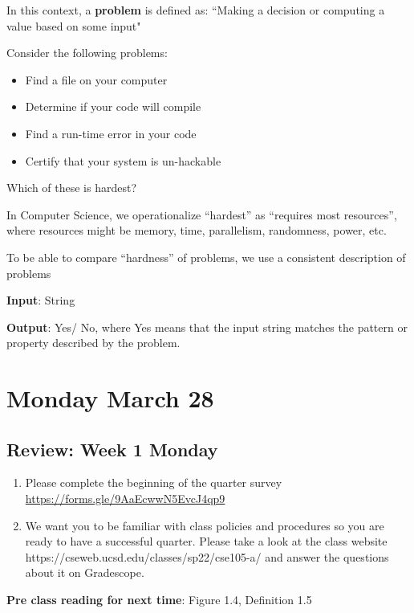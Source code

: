 In this context, a {\bf problem} is defined as: ``Making a decision or computing a value based on some input"

Consider the following problems: 
\begin{itemize}
   \item Find a file on your computer
   \item Determine if your code will compile
   \item Find a run-time error in your code
   \item Certify that your system is un-hackable
\end{itemize}

Which of these is hardest?

\vfill

In Computer Science, we operationalize ``hardest'' as ``requires most resources'', where
resources might be memory, time, parallelism, randomness, power, etc.

To be able to compare ``hardness'' of problems, we use a consistent description of problems

{\bf Input}: String

{\bf Output}: Yes/ No, where Yes means that the input string matches the pattern or property described by the problem.


\newpage
\section*{Monday March 28}


    
\newpage
\subsection*{Review: Week 1 Monday}
\begin{enumerate}
\item Please complete the beginning of the quarter survey \href{https://forms.gle/9AaEcwwN5EvcJ4qp9}{https://forms.gle/9AaEcwwN5EvcJ4qp9}
\item We want you to be familiar with class policies and procedures so you are ready to have a successful quarter. 
Please take a look at the class website https://cseweb.ucsd.edu/classes/sp22/cse105-a/
and answer the questions about it on Gradescope.
\end{enumerate}

{\bf Pre class reading for next time}: Figure 1.4, Definition 1.5

